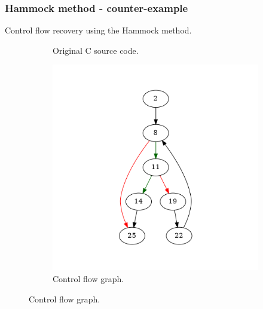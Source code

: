 \documentclass[aspectratio=1610]{beamer}
\begin{document}
\begin{frame}
	\frametitle{Hammock method - counter-example}
	Control flow recovery using the Hammock method.
	\begin{figure}[htbp]
		\centering
		\begin{subfigure}[b]{0.30\textwidth}
			\centering
			
			\caption{Original C source code.}
		\end{subfigure}
		\begin{subfigure}[b]{0.50\textwidth}
			\centering
			\includegraphics[height=0.6\paperheight]{inc/methods/hammock/counter-example/with-break/main.png}
			\caption{Control flow graph.}
		\end{subfigure}
	\end{figure}
\end{frame}
\end{document}
